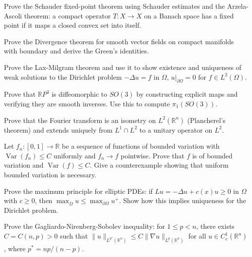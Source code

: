 \documentclass[12pt,a4paper]{exam}
\begin{document}
\begin{questions}
\vspace{0.3cm}

\question[4]
Prove the Schauder fixed-point theorem using Schauder estimates and the Arzela-Ascoli theorem: a compact operator $T: X \to X$ on a Banach space has a fixed point if it maps a closed convex set into itself.

\vspace{0.3cm}

\question[4]
Prove the Divergence theorem for smooth vector fields on compact manifolds with boundary and derive the Green's identities.

\vspace{0.3cm}

\question[6]
Prove the Lax-Milgram theorem and use it to show existence and uniqueness of weak solutions to the Dirichlet problem $-\Delta u = f$ in $\Omega$, $u|_{\partial\Omega} = 0$ for $f \in L^2(\Omega)$.

\vspace{0.3cm}

\question[4]
Prove that $\mathbb{R}P^3$ is diffeomorphic to $SO(3)$ by constructing explicit maps and verifying they are smooth inverses. Use this to compute $\pi_1(SO(3))$.

\vspace{0.3cm}

\question[4]
Prove that the Fourier transform is an isometry on $L^2(\mathbb{R}^n)$ (Plancherel's theorem) and extends uniquely from $L^1 \cap L^2$ to a unitary operator on $L^2$.

\vspace{0.3cm}

\question[5]
Let $f_n: [0,1] \to \mathbb{R}$ be a sequence of functions of bounded variation with $\operatorname{Var}(f_n) \leq C$ uniformly and $f_n \to f$ pointwise. Prove that $f$ is of bounded variation and $\operatorname{Var}(f) \leq C$. Give a counterexample showing that uniform bounded variation is necessary.

\vspace{0.3cm}

\question[4]
Prove the maximum principle for elliptic PDEs: if $Lu = -\Delta u + c(x) u \geq 0$ in $\Omega$ with $c \geq 0$, then $\max_{\overline{\Omega}} u \leq \max_{\partial\Omega} u^+$. Show how this implies uniqueness for the Dirichlet problem.

\vspace{0.3cm}

\question[6]
Prove the Gagliardo-Nirenberg-Sobolev inequality: for $1 \leq p < n$, there exists $C = C(n,p) > 0$ such that $\|u\|_{L^{p^*}(\mathbb{R}^n)} \leq C \|\nabla u\|_{L^p(\mathbb{R}^n)}$ for all $u \in C_c^1(\mathbb{R}^n)$, where $p^* = np/(n-p)$.


\end{questions}
\end{document}
